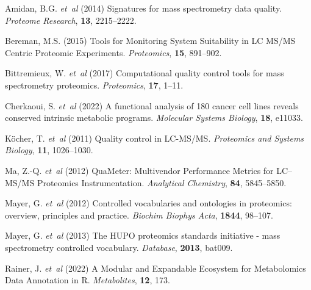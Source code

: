 \documentclass[unnumsec,webpdf,contemporary,large]{oup-authoring-template}%
\theoremstyle{thmstyleone}%
\theoremstyle{thmstyletwo}%
\theoremstyle{thmstylethree}%
\begin{document}
\begin{thebibliography}{10}
Amidan, B.G. \textit{et~al} (2014) Signatures for mass spectrometry data
quality.
\textit{Proteome Research}, \textbf{13}, 2215--2222.

Bereman, M.S. (2015) Tools for Monitoring System Suitability in LC MS/MS
Centric Proteomic Experiments.
\textit{Proteomics}, \textbf{15}, 891--902.

Bittremieux, W. \textit{et~al} (2017) Computational quality control tools for
mass spectrometry proteomics.
\textit{Proteomics}, \textbf{17}, 1--11.

Cherkaoui, S. \textit{et~al} (2022) A functional analysis of 180 cancer cell
lines reveals conserved intrinsic metabolic programs.
\textit{Molecular Systems Biology}, \textbf{18}, e11033.

K\"ocher, T. \textit{et~al} (2011) Quality control in LC-MS/MS.
\textit{Proteomics and Systems Biology}, \textbf{11}, 1026--1030.


Ma, Z.-Q. \textit{et~al} (2012) QuaMeter: Multivendor Performance Metrics
for LC–MS/MS Proteomics Instrumentation.
\textit{Analytical Chemistry}, \textbf{84}, 5845--5850.

Mayer, G. \textit{et~al} (2012) Controlled vocabularies and ontologies in 
proteomics: overview, principles and practice.
\textit{Biochim Biophys Acta}, \textbf{1844}, 98--107.

Mayer, G. \textit{et~al} (2013) The HUPO proteomics standards initiative - 
mass spectrometry controlled vocabulary.
\textit{Database}, \textbf{2013}, bat009.



Rainer, J. \textit{et~al} (2022) A Modular and Expandable Ecosystem for Metabolomics Data Annotation in R.
\textit{Metabolites}, \textbf{12}, 173.

\end{thebibliography}


%
%
\end{document}
